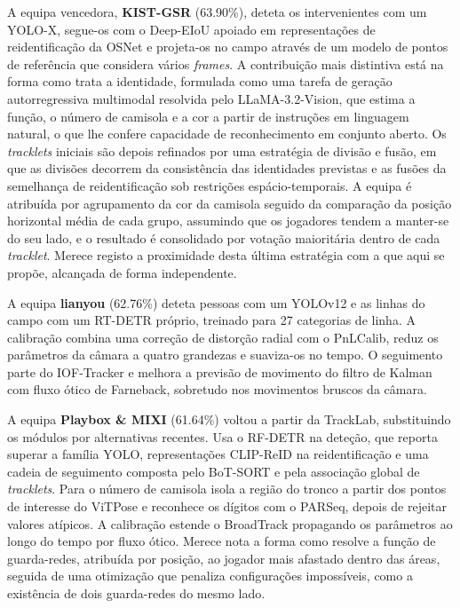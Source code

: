 A equipa vencedora, \textbf{KIST-GSR} (63.90\%), deteta os intervenientes com um YOLO-X,
segue-os com o Deep-EIoU apoiado em representações de reidentificação da OSNet e projeta-os
no campo através de um modelo de pontos de referência que considera vários \emph{frames}. A
contribuição mais distintiva está na forma como trata a identidade, formulada como uma
tarefa de geração autorregressiva multimodal resolvida pelo LLaMA-3.2-Vision, que estima a
função, o número de camisola e a cor a partir de instruções em linguagem natural, o que lhe
confere capacidade de reconhecimento em conjunto aberto. Os \emph{tracklets} iniciais são
depois refinados por uma estratégia de divisão e fusão, em que as divisões decorrem da
consistência das identidades previstas e as fusões da semelhança de reidentificação sob
restrições espácio-temporais. A equipa é atribuída por agrupamento da cor da camisola
seguido da comparação da posição horizontal média de cada grupo, assumindo que os jogadores
tendem a manter-se do seu lado, e o resultado é consolidado por votação maioritária dentro
de cada \emph{tracklet}. Merece registo a proximidade desta última estratégia com a que
aqui se propõe, alcançada de forma independente.

A equipa \textbf{lianyou} (62.76\%) deteta pessoas com um YOLOv12 e as linhas do campo com
um RT-DETR próprio, treinado para 27 categorias de linha. A calibração combina uma correção
de distorção radial com o PnLCalib, reduz os parâmetros da câmara a quatro grandezas e
suaviza-os no tempo. O seguimento parte do IOF-Tracker e melhora a previsão de movimento do
filtro de Kalman com fluxo ótico de Farneback, sobretudo nos movimentos bruscos da câmara.

A equipa \textbf{Playbox \& MIXI} (61.64\%) voltou a partir da TrackLab, substituindo os
módulos por alternativas recentes. Usa o RF-DETR na deteção, que reporta superar a família
YOLO, representações CLIP-ReID na reidentificação e uma cadeia de seguimento composta pelo
BoT-SORT e pela associação global de \emph{tracklets}. Para o número de camisola isola a
região do tronco a partir dos pontos de interesse do ViTPose e reconhece os dígitos com o
PARSeq, depois de rejeitar valores atípicos. A calibração estende o BroadTrack propagando os
parâmetros ao longo do tempo por fluxo ótico. Merece nota a forma como resolve a função de
guarda-redes, atribuída por posição, ao jogador mais afastado dentro das áreas, seguida de
uma otimização que penaliza configurações impossíveis, como a existência de dois
guarda-redes do mesmo lado.

